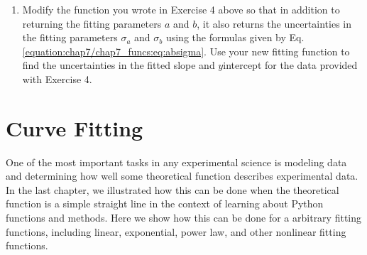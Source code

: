 \documentclass[letterpaper,10pt,english]{sphinxmanual}
\begin{document}
\begin{enumerate}
\begin{enumerate}
\begin{sphinxVerbatim}[commandchars=\\\{\},numbers=left,firstnumber=1,stepnumber=1]
   
   
         
                           
                           
                            
                             
                           
                           
                           
                           
                          
                          
\end{sphinxVerbatim}

\end{enumerate}

\item {} 
\sphinxAtStartPar
Modify the function  you wrote in Exercise 4 above so that in addition to returning the fitting parameters \(a\) and \(b\), it also returns the uncertainties in the fitting parameters \(\sigma_a\) and \(\sigma_b\) using the formulas given by Eq. \eqref{equation:chap7/chap7_funcs:eq:absigma}.  Use your new fitting function to find the uncertainties in the fitted slope and \(y\)\sphinxhyphen{}intercept for the data provided with Exercise 4.

\end{enumerate}

\sphinxstepscope

\ignorespaces 

\chapter{Curve Fitting}
\label{\detokenize{chap8/chap8_fitting:curve-fitting}}\label{\detokenize{chap8/chap8_fitting:chap8}}\label{\detokenize{chap8/chap8_fitting:index-0}}\label{\detokenize{chap8/chap8_fitting::doc}}
\sphinxAtStartPar
One of the most important tasks in any experimental science is modeling data and determining how well some theoretical function describes experimental data.  In the last chapter, we illustrated how this can be done when the theoretical function is a simple straight line in the context of learning about Python functions and methods.  Here we show how this can be done for a arbitrary fitting functions, including linear, exponential, power law, and other nonlinear fitting functions.
\end{document}
